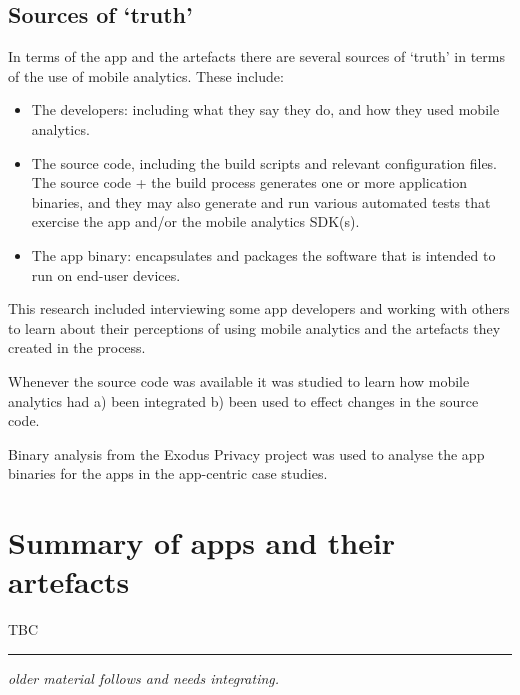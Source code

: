 \subsection{Sources of `truth'}
In terms of the app and the artefacts there are several sources of `truth' in terms of the use of mobile analytics. These include:
\begin{itemize}
    \itemsep0em
    \item The developers: including what they say they do, and how they used mobile analytics.
    \item The source code, including the build scripts and relevant configuration files. The source code + the build process generates one or more application binaries, and they may also generate and run various automated tests that exercise the app and/or the mobile analytics SDK(s).
    \item The app binary: encapsulates and packages the software that is intended to run on end-user devices. 
\end{itemize}

This research included interviewing some app developers and working with others to learn about their perceptions of using mobile analytics and the artefacts they created in the process.

Whenever the source code was available it was studied to learn how mobile analytics had a) been integrated b) been used to effect changes in the source code. 

Binary analysis from the Exodus Privacy project was used to analyse the app binaries for the apps in the app-centric case studies.


\section{Summary of apps and their artefacts}
TBC




\noindent\textcolor[RGB]{220,220,220}{\rule{\linewidth}{1pt}}
\emph{older material follows and needs integrating.}

